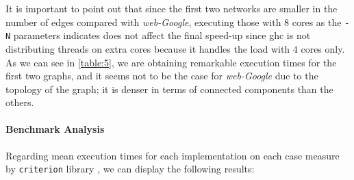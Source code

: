\begin{table}[H]
  \centering
 \caption[{[PoC] Execution times}]{This table shows the \acrshort{ghc} execution time measurement of selected networks. Column \texttt{Exec Param} describe the runtime flags provided to the running program. \texttt{MUT Time} is the time in seconds the program was executing computations (a.k.a. program time). \texttt{GC} Time is garbage collector time. Total time is the sum of \texttt{MUT} $+$ \texttt{GC} time.}
 \label{table:5}
 \end{table}

It is important to point out that since the first two networks are smaller in the number of edges compared with \emph{web-Google}, 
executing those with $8$ cores as the \texttt{-N} parameters indicates does not affect the final speed-up since \acrshort{ghc} 
is not distributing threads on extra cores because it handles the load with $4$ cores only.
As we can see in \autoref{table:5}, we are obtaining remarkable execution times for the first two graphs, and it seems not to be the case 
for \textit{web-Google} due to the topology of the graph; it is denser in terms of connected components than the others.

\paragraph{Benchmark Analysis} Regarding mean execution times for each implementation on each case measure by \texttt{criterion} library \cite{criterion}, we can display the following results:

